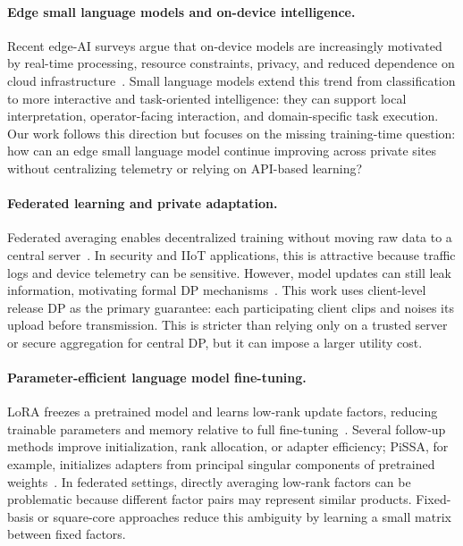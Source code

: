 \paragraph{Edge small language models and on-device intelligence.}
Recent edge-AI surveys argue that on-device models are increasingly motivated by real-time processing, resource constraints, privacy, and reduced dependence on cloud infrastructure~\citep{wang2025ondevice}. Small language models extend this trend from classification to more interactive and task-oriented intelligence: they can support local interpretation, operator-facing interaction, and domain-specific task execution. Our work follows this direction but focuses on the missing training-time question: how can an edge small language model continue improving across private sites without centralizing telemetry or relying on API-based learning?

\paragraph{Federated learning and private adaptation.}
Federated averaging enables decentralized training without moving raw data to a central server~\citep{mcmahan2017fedavg}. In security and IIoT applications, this is attractive because traffic logs and device telemetry can be sensitive. However, model updates can still leak information, motivating formal DP mechanisms~\citep{dwork2006dp,abadi2016dpsgd,mironov2017rdp}. This work uses client-level release DP as the primary guarantee: each participating client clips and noises its upload before transmission. This is stricter than relying only on a trusted server or secure aggregation for central DP, but it can impose a larger utility cost.

\paragraph{Parameter-efficient language model fine-tuning.}
LoRA freezes a pretrained model and learns low-rank update factors, reducing trainable parameters and memory relative to full fine-tuning~\citep{hu2021lora}. Several follow-up methods improve initialization, rank allocation, or adapter efficiency; PiSSA, for example, initializes adapters from principal singular components of pretrained weights~\citep{meng2024pissa}. In federated settings, directly averaging low-rank factors can be problematic because different factor pairs may represent similar products. Fixed-basis or square-core approaches reduce this ambiguity by learning a small matrix between fixed factors.

